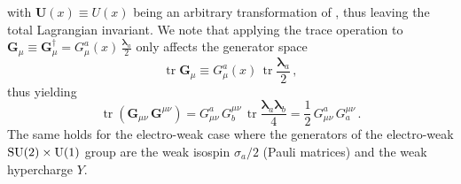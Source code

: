 with $\mathbf{U}(x) \equiv U(x)$ being an arbitrary transformation of \grpsuthree, thus leaving the total Lagrangian invariant.
We note that applying the trace operation to $\mathbf{G}_\mu \equiv \mathbf{G}_\mu^\dagger = G^a_\mu(x) \, \frac{\bm{\lambda}_a}{2}$ only affects the generator space
\begin{equation*}
  \operatorname{tr} \mathbf{G}_\mu \equiv G^a_\mu(x) \, \operatorname{tr} \frac{\bm{\lambda}_a}{2} \,,
\end{equation*}
thus yielding
\begin{equation*}
  \operatorname{tr} \left( \mathbf{G}_{\mu\nu} \, \mathbf{G}^{\mu\nu} \right) = G_{\mu\nu}^a \, G_b^{\mu\nu} \, \operatorname{tr} \frac{\bm{\lambda}_a \bm{\lambda}_b}{4} = 
  \frac{1}{2} \, G_{\mu\nu}^a \, G_a^{\mu\nu} \,. 
\end{equation*}
The same holds for the electro-weak case where the generators of the electro-weak ${\mathrm{SU}(2)} \times {\ensuremath{\mathrm{U}(1)}}$ group are the weak isospin $\sigma_a/2$ (Pauli matrices) and the weak hypercharge $Y$.

